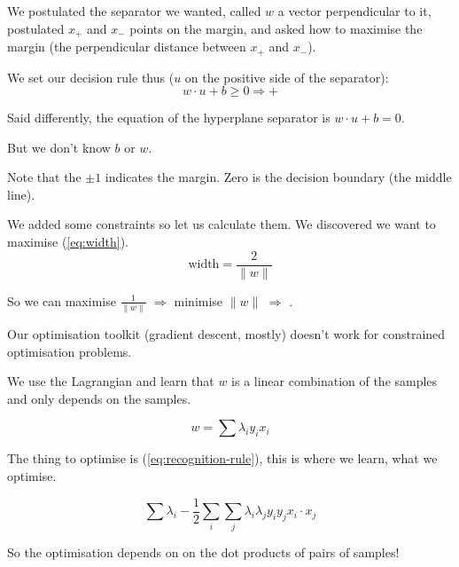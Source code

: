 We postulated the separator we wanted, called $w$ a vector
perpendicular to it, postulated $x_+$ and $x_-$ points on the margin,
and asked how to maximise the margin (the perpendicular distance
between $x_+$ and $x_-$).

\bigskip
\centerline{}
\bigskip

We set our decision rule thus ($u$ on the positive side of the
separator):
\begin{equation}
  \label{eq:decision-rule}
  \boxed{w\cdot u + b \ge 0 \Rightarrow +}
\end{equation}

Said differently, the equation of the hyperplane separator is
$w\cdot u + b = 0$.

But we don't know $b$ or $w$.

Note that the $\pm 1$ indicates the margin.  Zero is the decision
boundary (the middle line).

We added some constraints so let us calculate them.  We discovered we
want to maximise (\ref{eq:width}).
\begin{equation}
  \label{eq:width}
  \mbox{width} = \frac{2}{\parallel w\parallel}
\end{equation}

So we can maximise $\frac{1}{\parallel w\parallel}$ $\Rightarrow$
minimise $\parallel w\parallel$ $\Rightarrow$
.

\bigskip

Our optimisation toolkit (gradient descent, mostly) doesn't work for
constrained optimisation problems.

We use the Lagrangian and learn that $w$ is a linear combination of
the samples and only depends on the samples.

\begin{equation}
  \label{eq:w}
  w = \sum\lambda_i y_i x_i
\end{equation}

The thing to optimise is (\ref{eq:recognition-rule}), this is where we
learn, what we optimise.

\begin{equation}
  \label{eq:learning-rule}
  \sum\lambda_i - \frac 12 \sum_i \sum_j \lambda_i \lambda_j y_i y_j
  x_i\cdot x_j
\end{equation}

So the optimisation depends on on the dot products of pairs of
samples!

\bigskip

